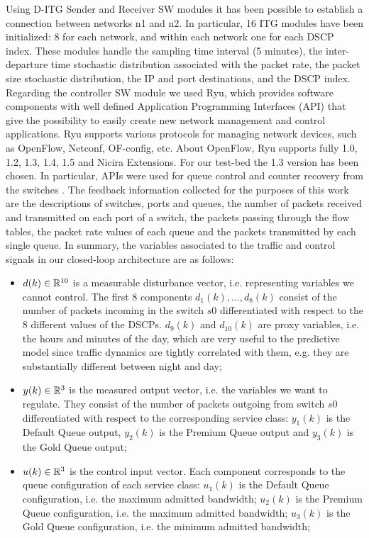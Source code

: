 Using D-ITG Sender and Receiver SW modules it has been possible to establish a connection between networks n1 and n2. In particular, 16 ITG modules have been initialized: 8 for each network, and within each network one for each DSCP index. These modules handle the sampling time interval (5 minutes), the inter-departure time stochastic distribution associated with the packet rate, the packet size stochastic distribution, the IP and port destinations, and the DSCP index. Regarding the controller SW module we used Ryu, which provides software components with well defined Application Programming Interfaces (API) that give the possibility to easily create new network management and control applications. Ryu supports various protocols for managing network devices, such as OpenFlow, Netconf, OF-config, etc. About OpenFlow, Ryu supports fully 1.0, 1.2, 1.3, 1.4, 1.5 and Nicira Extensions. For our test-bed the 1.3 version has been chosen. In particular, APIs were used for queue control and counter recovery from the switches \cite{ofctlrest,QoS}. The feedback information collected for the purposes of this work are the descriptions of switches, ports and queues, the number of packets received and transmitted on each port of a switch, the packets passing through the flow tables, the packet rate values of each queue and the packets transmitted by each single queue. In summary, the variables associated to the traffic and control signals in our closed-loop architecture are as follows:

\begin{itemize}
	\item $d(k)\in\mathbb{R}^{10}$ is a measurable disturbance vector, i.e. representing variables we cannot control. The first 8 components $d_1(k),\ldots,d_8(k)$ consist of the number of packets incoming in the switch $s0$ differentiated with respect to the 8 different values of the DSCPs. $d_9(k)$ and $d_{10}(k)$ are proxy variables, i.e. the hours and minutes of the day, which are very useful to the predictive model since traffic dynamics are tightly correlated with them, e.g. they are substantially different between night and day;
	\item $y(k)\in\mathbb{R}^{3}$ is the measured output vector, i.e. the variables we want to regulate. They consist of the number of packets outgoing from switch $s0$ differentiated with respect to the corresponding service class: $y_1(k)$ is the Default Queue output, $y_2(k)$ is the Premium Queue output and $y_3(k)$ is the Gold Queue output;
	\item $u(k)\in\mathbb{R}^{3}$ is the control input vector. Each component corresponds to the queue configuration of each service class: $u_1(k)$ is the Default Queue configuration, i.e. the maximum admitted bandwidth; $u_2(k)$ is the Premium Queue configuration, i.e. the maximum admitted bandwidth; $u_3(k)$ is the Gold Queue configuration, i.e. the minimum admitted bandwidth;
\end{itemize}

